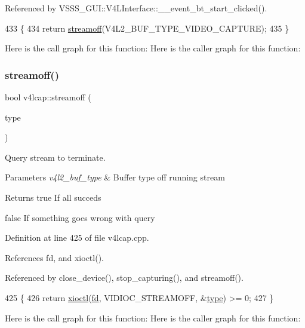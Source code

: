 Referenced by V\+S\+S\+S\+\_\+\+G\+U\+I\+::\+V4\+L\+Interface\+::\+\_\+\+\_\+event\+\_\+bt\+\_\+start\+\_\+clicked().


\begin{DoxyCode}
433                             \{
434     \textcolor{keywordflow}{return} \hyperlink{classv4lcap_ae15aa5107e993df45eb358a842d97e55}{streamoff}(V4L2\_BUF\_TYPE\_VIDEO\_CAPTURE);
435 \}
\end{DoxyCode}
Here is the call graph for this function\+:
Here is the caller graph for this function\+:
\mbox{\label{classv4lcap_ae15aa5107e993df45eb358a842d97e55}} 
\subsubsection{\texorpdfstring{streamoff()}{streamoff()}\hspace{0.1cm}{\footnotesize\ttfamily [1/2]}}
{\footnotesize\ttfamily bool v4lcap\+::streamoff (\begin{DoxyParamCaption}\item[{enum v4l2\+\_\+buf\+\_\+type}]{type }\end{DoxyParamCaption})}



Query stream to terminate. 


\begin{DoxyParams}{Parameters}
{\em v4l2\+\_\+buf\+\_\+type} & Buffer type off running stream \\
\hline
\end{DoxyParams}
\begin{DoxyReturn}{Returns}
true If all succeds 

false If something goes wrong with query 
\end{DoxyReturn}


Definition at line 425 of file v4lcap.\+cpp.



References fd, and xioctl().



Referenced by close\+\_\+device(), stop\+\_\+capturing(), and streamoff().


\begin{DoxyCode}
425                                               \{
426     \textcolor{keywordflow}{return} \hyperlink{classv4lcap_ab5aaa5a8c0df17f5ca57e0b5170232cb}{xioctl}(\hyperlink{classv4lcap_a38109593bde997dad13b3a461569573d}{fd}, VIDIOC\_STREAMOFF, &\hyperlink{classstd_1_1conditional_1_1type}{type}) >= 0;
427 \}
\end{DoxyCode}
Here is the call graph for this function\+:
Here is the caller graph for this function\+:
\mbox{\label{classv4lcap_a34eced9e309545a1b6bb41a41c23bc57}} 
